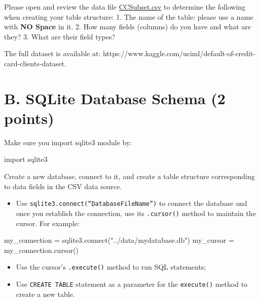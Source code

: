 \documentclass[
  letterpaper,
]{scrbook}
\newenvironment{Shaded}{\begin{snugshade}}{\end{snugshade}}
\newcommand{\ExtensionTok}[1]{\textcolor[rgb]{0.00,0.23,0.31}{#1}}
\newcommand{\ImportTok}[1]{\textcolor[rgb]{0.00,0.46,0.62}{#1}}
\newcommand{\NormalTok}[1]{\textcolor[rgb]{0.00,0.23,0.31}{#1}}
\newcommand{\OperatorTok}[1]{\textcolor[rgb]{0.37,0.37,0.37}{#1}}
\newcommand{\StringTok}[1]{\textcolor[rgb]{0.13,0.47,0.30}{#1}}
\providecommand{\tightlist}{%
  \setlength{\itemsep}{0pt}\setlength{\parskip}{0pt}}
\begin{document}
Please open and review the data file
\href{../data/CCSubset.csv}{CCSubset.csv} to determine the following
when creating your table structure: 1. The name of the table: please use
a name with \textbf{NO Space} in it. 2. How many fields (columns) do you
have and what are they? 3. What are their field types?

The full dataset is available at:
https://www.kaggle.com/uciml/default-of-credit-card-clients-dataset.

\section*{B. SQLite Database Schema (2
points)}\label{b.-sqlite-database-schema-2-points}


Make sure you import sqlite3 module by:

\begin{Shaded}
\begin{Highlighting}[]
\ImportTok{import}\NormalTok{ sqlite3}
\end{Highlighting}
\end{Shaded}

Create a new database, connect to it, and create a table structure
corresponding to data fields in the CSV data source.

\begin{itemize}
\tightlist
\item
  Use \texttt{sqlite3.connect(“DatabaseFileName”)} to connect the
  database and once you establish the connection, use its
  \texttt{.cursor()} method to maintain the cursor. For example:
\end{itemize}

\begin{Shaded}
\begin{Highlighting}[]
\NormalTok{my\_connection }\OperatorTok{=}\NormalTok{ sqlite3.}\ExtensionTok{connect}\NormalTok{(}\StringTok{"../data/mydatabase.db"}\NormalTok{)}
\NormalTok{my\_cursor }\OperatorTok{=}\NormalTok{ my\_connection.cursor()}
\end{Highlighting}
\end{Shaded}

\begin{itemize}
\item
  Use the cursor's \texttt{.execute()} method to run SQL statements;
\item
  Use \texttt{CREATE\ TABLE} statement as a parameter for the
  \texttt{execute()} method to create a new table.
\end{itemize}
\end{document}
